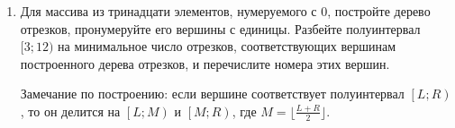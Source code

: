 \documentclass[a4paper,10pt]{article}
\begin{document}
\begin{enumerate}
    \item Для массива из тринадцати элементов, нумеруемого с $0$,
      постройте дерево отрезков, пронумеруйте его вершины с единицы.
      Разбейте полуинтервал $[3; 12)$ на минимальное число отрезков,
      соответствующих вершинам построенного дерева отрезков,
      и перечислите номера этих вершин.

      Замечание по построению: если вершине соответствует полуинтервал
      $\left[L;R\right)$, то он делится на $\left[L;M\right)$ и $\left[M;R\right)$,
      где $M=\lfloor\frac{L+R}{2}\rfloor$.
  \end{enumerate}
\end{document}
